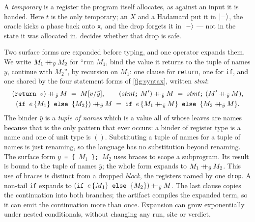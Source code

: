 \documentclass[acmsmall,screen,review,anonymous,nonacm]{acmart}
\begin{document}
\smallskip\noindent
\newsavebox{\progbox}%
%
\usebox{\progbox}\hfill
\begin{minipage}[t]{\dimexpr\linewidth-\wd\progbox-1.5em\relax}
\noindent A \emph{temporary} is a register the program itself allocates, as against
an input it is handed. Here $t$ is the only temporary; an $X$ and a Hadamard put it in
$\lvert - \rangle$, the oracle kicks a phase back onto \texttt{x}, and the drop forgets it in
$\lvert - \rangle$ --- not in the state it was allocated in.  decides
whether that drop is safe.
\end{minipage}
\smallskip

Two surface forms are expanded before typing, and one operator expands
them. We write $M_1 \mathbin{+\mkern-8mu+}_{\bar y} M_2$ for ``run $M_1$, bind the value
it returns to the tuple of names $\bar y$, continue with $M_2$'', by
recursion on $M_1$: one clause for \texttt{return}, one for \texttt{if},
and one shared by the four statement forms of \cref{fig:syntax}, written
\textit{stmt}:
\[
\begin{gathered}
  (\texttt{return } v) \seqop_{\bar y} M \;=\; M[v/\bar y],
  \qquad
  (\textit{stmt}\texttt{;}\ M') \seqop_{\bar y} M
    \;=\; \textit{stmt}\texttt{;}\ (M' \seqop_{\bar y} M),\\
  (\texttt{if } e\,\{M_1\}\texttt{ else }\{M_2\}) \seqop_{\bar y} M
    \;=\; \texttt{if } e\,\{M_1 \seqop_{\bar y} M\}\texttt{ else }\{M_2 \seqop_{\bar y} M\}.
\end{gathered}
\]
The binder $\bar y$ is a \emph{tuple of names} which is a value all of whose leaves are
names because that is the only pattern that ever occurs: a binder of register
type is a name and one of unit type is $()$. Substituting a tuple of names for a
tuple of names is just renaming, so the language has no substitution beyond renaming.
The surface form \texttt{$\bar y$ = \{ $M_1$ \}; $M_2$} uses braces to
scope a subprogram. Its result is bound to the tuple of names $\bar y$;
the whole form expands to $M_1 \mathbin{+\mkern-8mu+}_{\bar y} M_2$. This use of braces
is distinct from a dropped \emph{block}, the registers named by one
\texttt{drop}. A non-tail \texttt{if} expands to
$(\texttt{if } e\,\{M_1\}\texttt{ else }\{M_2\})\mathbin{+\mkern-8mu+}_{\bar y} M$. The last clause copies the continuation into both branches; the
artifact compiles the expanded term, so it can emit the continuation more
than once. Expansion can grow exponentially under nested conditionals, without
changing any run, site or verdict.
\end{document}
